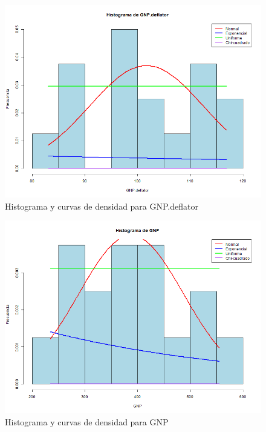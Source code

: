 \documentclass{article}
\begin{document}
\begin{figure}[H]
    \centering
    \includegraphics[width=\textwidth]{HistogramasDensidad/histograma_GNP.deflator.png}
    \caption{Histograma y curvas de densidad para GNP.deflator}
\end{figure}

\begin{figure}[H]
    \centering
    \includegraphics[width=\textwidth]{HistogramasDensidad/histograma_GNP.png}
    \caption{Histograma y curvas de densidad para GNP}
\end{figure}
\end{document}
